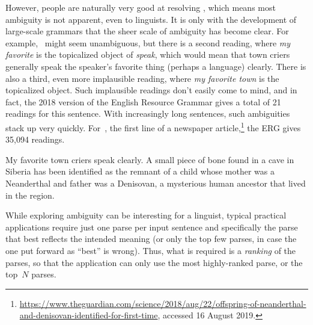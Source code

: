 \documentclass[output=paper
                ,modfonts
                ,nonflat
	        ,collection
	        ,collectionchapter
	        ,collectiontoclongg
 	        ,biblatex
                ,babelshorthands
                ,newtxmath
                ,draftmode
                ,colorlinks, citecolor=brown
]{./langsci/langscibook}
\begin{document}
However, people are naturally very good at resolving ,
which means most ambiguity is not apparent, even to linguists.
It is only with the development of large-scale grammars that the sheer scale of ambiguity has become clear.
For example, ~might seem unambiguous,
but there is a second reading, where \textit{my favorite} is the topicalized object of \textit{speak},
which would mean that town criers generally speak the speaker's favorite thing (perhaps a language) clearly.
There is also a third, even more implausible reading, where \textit{my favorite town} is the topicalized object.
Such implausible readings don't easily come to mind,
and in fact, the 2018 version of the English Resource Grammar \citep[ERG;][]{Flickinger2000a,Flickinger2011a-u}
gives a total of 21 readings for this sentence.
With increasingly long sentences, such ambiguities stack up very quickly.
For~, the first line of a newspaper article,\footnote{%
	\url{https://www.theguardian.com/science/2018/aug/22/offspring-of-neanderthal-and-denisovan-identified-for-first-time}, accessed 16 August 2019.}
the ERG gives 35,094 readings.

\begin{exe}
\ex\label{cl:ex:ambig-simple}
My favorite town criers speak clearly.
\ex\label{cl:ex:ambig-many}
A small piece of bone found in a cave in Siberia has been identified
as the remnant of a child whose mother was a Neanderthal and father was a Denisovan,
a mysterious human ancestor that lived in the region.
\end{exe}

While exploring ambiguity can be interesting for a linguist,
typical practical applications require just one parse per input sentence
and specifically the parse that best reflects the intended meaning
(or only the top few parses, in case the one put forward as ``best'' is wrong).
Thus, what is required is a \textit{ranking} of the parses,
so that the application can only use the most highly-ranked parse,
or the top~$N$ parses.
\end{document}
